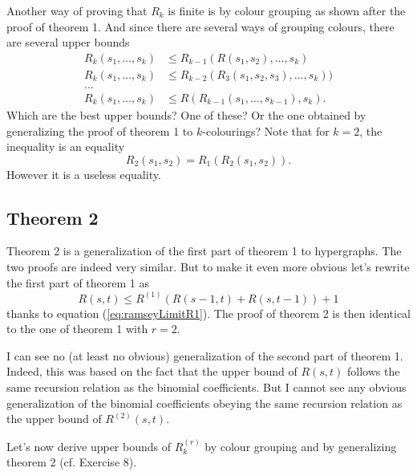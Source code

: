 \medskip

Another way of proving that $R_k$ is finite is by colour grouping as shown after the proof of theorem 1.
And since there are several ways of grouping colours, there are several upper bounds
\begin{align}
    R_k(s_1,\dots,s_k) & \leq R_{k-1}(R(s_1,s_2),\dots,s_k) \\
    R_k(s_1,\dots,s_k) & \leq R_{k-2}(R_3(s_1,s_2,s_3),\dots,s_k)) \\
    \dots \nonumber \\
    R_k(s_1,\dots,s_k) & \leq R(R_{k-1}(s_1,\dots,s_{k-1}),s_k) .
\end{align}
Which are the best upper bounds? One of these? Or the one obtained by generalizing the proof of theorem 1 to $k$-colourings?
Note that for $k=2$, the inequality is an equality
\begin{equation}
    R_2(s_1,s_2) = R_1(R_2(s_1,s_2)) .
\end{equation}
However it is a useless equality.

\subsection{Theorem 2}

Theorem 2 is a generalization of the first part of theorem 1 to hypergraphs.
The two proofs are indeed very similar.
But to make it even more obvious let's rewrite the first  part of theorem 1 as
\begin{equation}
    R(s,t) \leq R^{(1)}(R(s-1,t)+R(s,t-1))+1
    \nonumber
\end{equation}
thanks to equation (\ref{eq:ramseyLimitR1}).
The proof of theorem 2 is then identical to the one of theorem 1 with $r=2$.

I can see no (at least no obvious) generalization of the second part of theorem 1.
Indeed, this was based on the fact that the upper bound of $R(s,t)$ follows the same recursion relation as the binomial coefficients.
But I cannot see any obvious generalization of the binomial coefficients obeying the same recursion relation as the upper bound of $R^{(2)}(s,t)$.

\medskip

Let's now derive upper bounds of $R_k^{(r)}$ by colour grouping and by generalizing theorem 2 (cf. Exercise 8).
